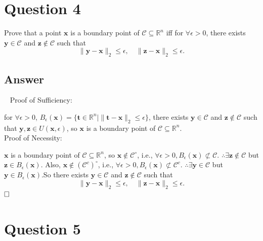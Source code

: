 \documentclass[
	12pt, %
]{fphw}
\begin{document}

\section*{Question 4}

\begin{problem}
Prove that a point $\mathbf{x}$ is a boundary point of $\mathcal{C}\subseteq \mathbb{R}^n$ iff for $\forall \epsilon >0$, there exists $\mathbf{y}\in \mathcal{C}$ and $\mathbf{z}\notin \mathcal{C}$ such that
$$\|\mathbf{y}-\mathbf{x}\|_2 \leq \epsilon, \quad \|\mathbf{z}-\mathbf{x}\|_2 \leq \epsilon.$$
\end{problem}


\subsection*{Answer}
\ 
\newline
\noindent Proof of Sufficiency:

for $\forall \epsilon > 0$, $B_{\epsilon}(\mathbf{x})=\{\mathbf{t}\in \mathbb{R}^n|\|\mathbf{t}-\mathbf{x}\|_2\leq \epsilon\}$, there exists $\mathbf{y}\in \mathcal{C}$ and $\mathbf{z}\notin \mathcal{C}$ such that $\mathbf{y},\mathbf{z}\in U(\mathbf{x},\epsilon)$, so $\mathbf{x}$ is a boundary point of $\mathcal{C}\subseteq \mathbb{R}^n$.\\

\noindent Proof of Necessity:

$\mathbf{x}$ is a boundary point of $\mathcal{C}\subseteq \mathbb{R}^n$, so $\mathbf{x} \notin \mathcal{C}^{\circ}$, i.e., $\forall \epsilon >0, B_{\epsilon}(\mathbf{x}) \not \subset \mathcal{C}$.
$\therefore \exists \mathbf{z} \notin \mathcal{C}$ but $\mathbf{z} \in B_{\epsilon}(\mathbf{x})$. Also, $\mathbf{x} \notin (\mathcal{C}^c)^{\circ}$, i.e., $\forall \epsilon >0, B_{\epsilon}(\mathbf{x}) \not \subset \mathcal{C}^c$.
$\therefore \exists \mathbf{y} \in \mathcal{C}$ but $\mathbf{y} \in B_{\epsilon}(\mathbf{x})$.So there exists $\mathbf{y}\in \mathcal{C}$ and $\mathbf{z}\notin \mathcal{C}$ such that
$$\|\mathbf{y}-\mathbf{x}\|_2 \leq \epsilon, \quad \|\mathbf{z}-\mathbf{x}\|_2 \leq \epsilon.$$
$\hfill \square$ 

\section*{Question 5}
\end{document}
